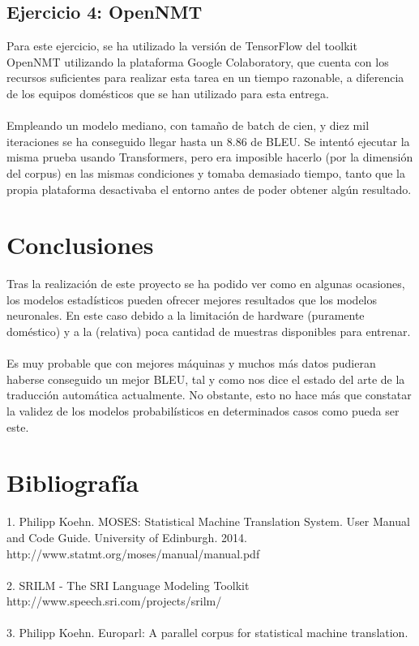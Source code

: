 \documentclass[12pt]{article}
\begin{document}
\subsection*{Ejercicio 4: OpenNMT}

Para este ejercicio, se ha utilizado la versión de TensorFlow del toolkit OpenNMT utilizando la plataforma Google Colaboratory, que cuenta con los recursos suficientes para realizar esta tarea en un tiempo razonable, a diferencia de los equipos domésticos que se han utilizado para esta entrega.
\\\\
Empleando un modelo mediano, con tamaño de batch de cien, y diez mil iteraciones se ha conseguido llegar hasta un 8.86 de BLEU. Se intentó ejecutar la misma prueba usando Transformers, pero era imposible hacerlo (por la dimensión del corpus) en las mismas condiciones y tomaba demasiado tiempo, tanto que la propia plataforma desactivaba el entorno antes de poder obtener algún resultado.
\newpage

\section*{Conclusiones}
Tras la realización de este proyecto se ha podido ver como en algunas ocasiones, los modelos estadísticos pueden ofrecer mejores resultados que los modelos neuronales. En este caso debido a la limitación de hardware (puramente doméstico) y a la (relativa) poca cantidad de muestras disponibles para entrenar.
\\\\
Es muy probable que con mejores máquinas y muchos más datos pudieran haberse conseguido un mejor BLEU, tal y como nos dice el estado del arte de la traducción automática actualmente. No obstante, esto no hace más que constatar la validez de los modelos probabilísticos en determinados casos como pueda ser este.



\newpage

\section*{Bibliografía}
1. Philipp Koehn. MOSES: Statistical Machine Translation System. User Manual and Code Guide. University of Edinburgh. 2014. 
\\
http://www.statmt.org/moses/manual/manual.pdf
~\\\\
2. SRILM - The SRI Language Modeling Toolkit
\\
http://www.speech.sri.com/projects/srilm/
~\\\\
3. Philipp Koehn. Europarl: A parallel corpus for statistical machine translation.


\newpage
\end{document}
